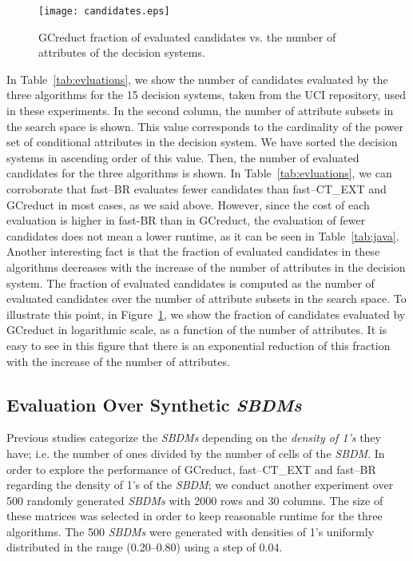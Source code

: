 \documentclass[number,preprint,review,12pt]{elsarticle}
\begin{document}
	\begin{figure}[htb]
		\begin{center}
			\texttt{[image: candidates.eps]}
		\end{center}
		\caption{GCreduct fraction of evaluated candidates vs. the number of attributes of the decision systems.}
		\label{fig:candidates}
	\end{figure}	

	In Table~\ref{tab:evluations}, we show the number of candidates evaluated by the three algorithms for the 15 decision systems, taken from the UCI repository, used in these experiments. In the second column, the number of attribute subsets in the search space is shown. This value corresponds to the cardinality of the power set of conditional attributes in the decision system. We have sorted the decision systems in ascending order of this value. Then, the number of evaluated candidates for the three algorithms is shown. In Table~\ref{tab:evluations}, we can corroborate that fast--BR evaluates fewer candidates than fast--CT\_EXT and GCreduct in most cases, as we said above. However, since the cost of each evaluation is higher in fast-BR than in GCreduct, the evaluation of fewer candidates does not mean a lower runtime, as it can be seen in Table~\ref{tab:java}. Another interesting fact is that the fraction of evaluated candidates in these algorithms decreases with the increase of the number of attributes in the decision system. The fraction of evaluated candidates is computed as the number of evaluated candidates over the number of attribute subsets in the search space. To illustrate this point, in Figure~\ref{fig:candidates}, we show the fraction of candidates evaluated by GCreduct in logarithmic scale, as a function of the number of attributes. It is easy to see in this figure that there is an exponential reduction of this fraction with the increase of the number of attributes. \label{par:brutal}
		
		
\subsection{Evaluation Over Synthetic \textit{SBDMs}}\label{sub:synth}

	Previous studies \citep{Rojas12,Lias13,Rodriguez15} categorize the \textit{SBDMs} depending on the \emph{density of 1's} they have; i.e. the number of ones divided by the number of cells of the \textit{SBDM}. In order to explore the performance of GCreduct, fast--CT\_EXT and fast--BR regarding the density of 1's of the \textit{SBDM}; we conduct another experiment over 500 randomly generated \textit{SBDMs} with 2000 rows and 30 columns. The size of these matrices was selected in order to keep reasonable runtime for the three algorithms. The 500 \textit{SBDMs} were generated with densities of 1's uniformly distributed in the range (0.20--0.80) using a step of 0.04. 
				
\end{document}
